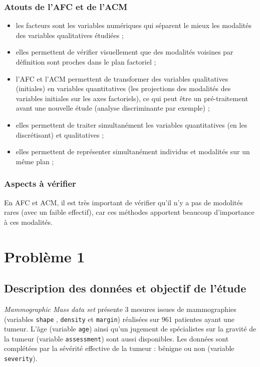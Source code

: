 \documentclass[a4paper]{report}
\begin{document}
\subsection{Atouts de l'AFC et de l'ACM}
\begin{itemize}
 \item les facteurs sont les variables numériques qui séparent le mieux les modalités des variables qualitatives étudiées ;
 \item elles permettent de vérifier visuellement que des modalités voisines par définition sont proches dans le plan factoriel ;
 \item l'AFC et l'ACM permettent de transformer des variables qualitatives (initiales) en variables quantitatives (les projections des modalités des variables initiales sur les axes factoriels), ce qui peut être un pré-traitement avant une nouvelle étude (analyse discriminante par exemple) ;
 \item elles permettent de traiter simultanément les variables quantitatives (en les discrétisant) et qualitatives ; 
 \item elles permettent de représenter simultanément individus et modalités sur un même plan ;
 \end{itemize}
 
 \subsection{Aspects à vérifier}
 En AFC et ACM, il est très important de vérifier qu'il n'y a pas de modolités rares (avec un faible effectif), car ces méthodes apportent beaucoup d'importance à ces modalités. 
 
 
 \chapter{Problème 1}
 
\section{Description des données et objectif de l'étude}

\emph{Mammographic Mass data set} présente 3 mesures issues de mammographies (variables \verb|shape| , \verb|density| et \verb|margin|) réalisées sur 961 patientes ayant une tumeur. L'âge (variable \verb|age|) ainsi qu'un jugement de spécialistes sur la gravité de la tumeur (variable \verb|assessment|) sont aussi disponibles. Les données sont complétées par la sévérité effective de la tumeur : bénigne ou non (variable \verb|severity|).
\end{document}
